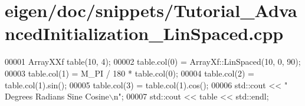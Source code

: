 \hypertarget{eigen_2doc_2snippets_2_tutorial___advanced_initialization___lin_spaced_8cpp_source}{}\section{eigen/doc/snippets/\+Tutorial\+\_\+\+Advanced\+Initialization\+\_\+\+Lin\+Spaced.cpp}
\label{eigen_2doc_2snippets_2_tutorial___advanced_initialization___lin_spaced_8cpp_source}

\begin{DoxyCode}
00001 ArrayXXf table(10, 4);
00002 table.col(0) = ArrayXf::LinSpaced(10, 0, 90);
00003 table.col(1) = M\_PI / 180 * table.col(0);
00004 table.col(2) = table.col(1).sin();
00005 table.col(3) = table.col(1).cos();
00006 std::cout << \textcolor{stringliteral}{"  Degrees   Radians      Sine    Cosine\(\backslash\)n"};
00007 std::cout << table << std::endl;
\end{DoxyCode}
